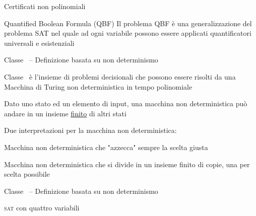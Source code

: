 \begin{frame}{Certificati non polinomiali}

\vspace{-9pt}
\begin{block}{Quantified Boolean Formula (QBF)}
Il problema QBF è una generalizzazione del problema SAT nel quale ad ogni variabile possono essere applicati quantificatori universali e esistenziali
\end{block}

\end{frame}

\begin{frame}{Classe \NP\ -- Definizione basata su non determinismo}

\vspace{-9pt}
\begin{block}{Classe \NP}
\NP\ è l'insieme di problemi decisionali che possono essere risolti da
una Macchina di Turing non deterministica in tempo polinomiale
\end{block}

\bigskip
{}
\BIL
\item Dato uno stato ed un elemento di input, una macchina non deterministica
può andare in un insieme \underline{finito} di altri stati
\item Due interpretazioni per la macchina non deterministica:
  \BI
  \item Macchina non deterministica che "azzecca" sempre la scelta giusta 
  \item Macchina non deterministica che si divide in un insieme finito di copie, una per scelta possibile
  \EI
\EIL

\end{frame}

\begin{frame}{Classe \NP\ -- Definizione basata su non determinismo}

\textsc{sat} con quattro variabili

\bigskip
{}

\end{frame}

